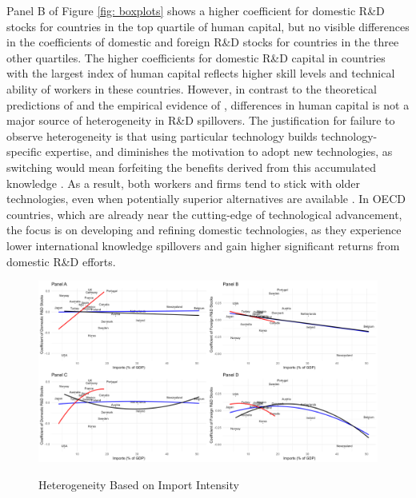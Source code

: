 \documentclass[12pt]{article}
\begin{document}
Panel B of Figure \ref{fig: boxplots} shows a higher coefficient for domestic R\&D stocks for countries in the top quartile of human capital, but no visible differences in the coefficients of domestic and foreign R\&D stocks for countries in the three other quartiles. The higher coefficients for domestic R\&D capital in countries with the largest index of human capital reflects higher skill levels and technical ability of workers in these countries. However, in contrast to the theoretical predictions of \citet{Benhabib1994} and the empirical evidence of \citet{Coe2009}, differences in human capital is not a major source of heterogeneity in R\&D spillovers. The justification for failure to observe heterogeneity is that using particular technology builds technology-specific expertise, and diminishes the motivation to adopt new technologies, as switching would mean forfeiting the benefits derived from this accumulated knowledge \citep{Jovanovic1996}. As a result, both workers and firms tend to stick with older technologies, even when potentially superior alternatives are available \citet{Comin2004}. In OECD countries, which are already near the cutting-edge of technological advancement, the focus is on developing and refining domestic technologies, as they experience lower international knowledge spillovers and gain higher significant returns from domestic R\&D efforts.

\begin{figure}[ht!]
    \centering
    \doublespacing
    \caption{Heterogeneity Based on Import Intensity}
    \includegraphics[width=1\linewidth]{HC_IMP.png}
    \label{fig: imp}
\end{figure}
\end{document}
